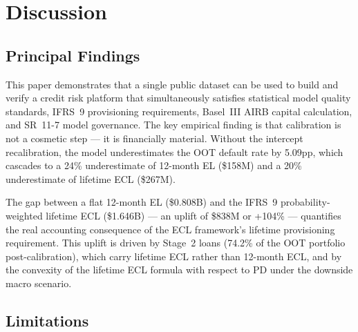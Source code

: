 \documentclass[12pt,a4paper]{report}
\begin{document}
\chapter{Discussion}
\label{ch:discussion}

\section{Principal Findings}

This paper demonstrates that a single public dataset can be used to build and verify a credit risk platform that simultaneously satisfies statistical model quality standards, IFRS~9 provisioning requirements, Basel~III AIRB capital calculation, and SR~11-7 model governance. The key empirical finding is that calibration is not a cosmetic step --- it is financially material. Without the intercept recalibration, the model underestimates the OOT default rate by 5.09pp, which cascades to a 24\% underestimate of 12-month EL (\$158M) and a 20\% underestimate of lifetime ECL (\$267M).

The gap between a flat 12-month EL (\$0.808B) and the IFRS~9 probability-weighted lifetime ECL (\$1.646B) --- an uplift of \$838M or +104\% --- quantifies the real accounting consequence of the ECL framework's lifetime provisioning requirement. This uplift is driven by Stage~2 loans (74.2\% of the OOT portfolio post-calibration), which carry lifetime ECL rather than 12-month ECL, and by the convexity of the lifetime ECL formula with respect to PD under the downside macro scenario.

\section{Limitations}
\label{sec:limitations}
\end{document}
